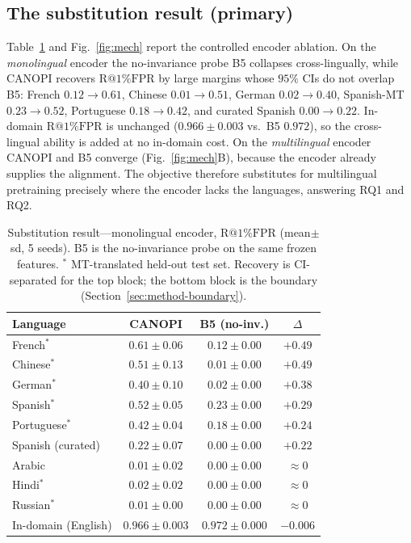 \documentclass[pdflatex,sn-mathphys-num]{sn-jnl}
\makeatletter
\newcommand{\Rfpr}{\textrm{R@1\%FPR}}
\theoremstyle{plain}
\makeatother
\begin{document}
\subsection{The substitution result (primary)}\label{sec:res-mech}
Table~\ref{tab:mech} and Fig.~\ref{fig:mech} report the controlled encoder
ablation. On the \emph{monolingual} encoder the no-invariance probe B5 collapses
cross-lingually, while CANOPI recovers $\Rfpr$ by large margins whose $95\%$ CIs do
not overlap B5: French $0.12\!\to\!0.61$, Chinese $0.01\!\to\!0.51$, German
$0.02\!\to\!0.40$, Spanish-MT $0.23\!\to\!0.52$, Portuguese $0.18\!\to\!0.42$, and
curated Spanish $0.00\!\to\!0.22$. In-domain $\Rfpr$ is unchanged ($0.966\pm0.003$
vs.\ B5 $0.972$), so the cross-lingual ability is added at no in-domain cost. On the
\emph{multilingual} encoder CANOPI and B5 converge (Fig.~\ref{fig:mech}B), because
the encoder already supplies the alignment. The objective therefore substitutes for
multilingual pretraining precisely where the encoder lacks the languages, answering
RQ1 and RQ2.

\begin{table}[t]\centering
\caption{Substitution result---monolingual encoder, $\Rfpr$ (mean$\pm$sd, 5 seeds).
B5 is the no-invariance probe on the same frozen features. $^{*}$ MT-translated
held-out test set. Recovery is CI-separated for the top block; the bottom block is
the boundary (Section~\ref{sec:method-boundary}).}\label{tab:mech}
\begin{tabular}{lccc}
\toprule
Language & CANOPI & B5 (no-inv.) & $\Delta$ \\
\midrule
French$^{*}$  & $0.61\pm0.06$ & $0.12\pm0.00$ & $+0.49$ \\
Chinese$^{*}$ & $0.51\pm0.13$ & $0.01\pm0.00$ & $+0.49$ \\
German$^{*}$  & $0.40\pm0.10$ & $0.02\pm0.00$ & $+0.38$ \\
Spanish$^{*}$ & $0.52\pm0.05$ & $0.23\pm0.00$ & $+0.29$ \\
Portuguese$^{*}$ & $0.42\pm0.04$ & $0.18\pm0.00$ & $+0.24$ \\
Spanish (curated) & $0.22\pm0.07$ & $0.00\pm0.00$ & $+0.22$ \\
\midrule
Arabic & $0.01\pm0.02$ & $0.00\pm0.00$ & $\approx 0$ \\
Hindi$^{*}$ & $0.02\pm0.02$ & $0.00\pm0.00$ & $\approx 0$ \\
Russian$^{*}$ & $0.01\pm0.00$ & $0.00\pm0.00$ & $\approx 0$ \\
\midrule
In-domain (English) & $0.966\pm0.003$ & $0.972\pm0.000$ & $-0.006$ \\
\bottomrule
\end{tabular}
\end{table}
\end{document}
